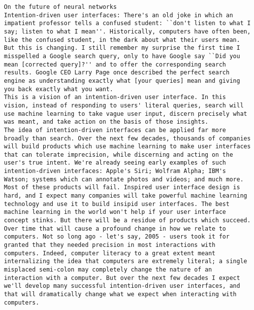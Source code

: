 \begin{lstlisting}
On the future of neural networks
Intention-driven user interfaces: There's an old joke in which an impatient professor tells a confused student: ``don't listen to what I say; listen to what I mean''. Historically, computers have often been, like the confused student, in the dark about what their users mean. But this is changing. I still remember my surprise the first time I misspelled a Google search query, only to have Google say ``Did you mean [corrected query]?'' and to offer the corresponding search results. Google CEO Larry Page once described the perfect search engine as understanding exactly what [your queries] mean and giving you back exactly what you want.
This is a vision of an intention-driven user interface. In this vision, instead of responding to users' literal queries, search will use machine learning to take vague user input, discern precisely what was meant, and take action on the basis of those insights.
The idea of intention-driven interfaces can be applied far more broadly than search. Over the next few decades, thousands of companies will build products which use machine learning to make user interfaces that can tolerate imprecision, while discerning and acting on the user's true intent. We're already seeing early examples of such intention-driven interfaces: Apple's Siri; Wolfram Alpha; IBM's Watson; systems which can annotate photos and videos; and much more.
Most of these products will fail. Inspired user interface design is hard, and I expect many companies will take powerful machine learning technology and use it to build insipid user interfaces. The best machine learning in the world won't help if your user interface concept stinks. But there will be a residue of products which succeed. Over time that will cause a profound change in how we relate to computers. Not so long ago - let's say, 2005 - users took it for granted that they needed precision in most interactions with computers. Indeed, computer literacy to a great extent meant internalizing the idea that computers are extremely literal; a single misplaced semi-colon may completely change the nature of an interaction with a computer. But over the next few decades I expect we'll develop many successful intention-driven user interfaces, and that will dramatically change what we expect when interacting with computers.

\end{lstlisting}
